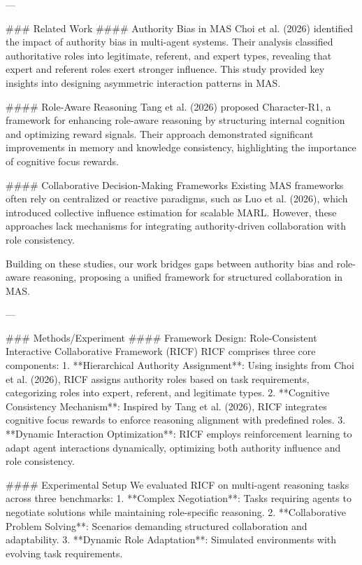 ---

### Related Work
#### Authority Bias in MAS
Choi et al. (2026) identified the impact of authority bias in multi-agent systems. Their analysis classified authoritative roles into legitimate, referent, and expert types, revealing that expert and referent roles exert stronger influence. This study provided key insights into designing asymmetric interaction patterns in MAS.

#### Role-Aware Reasoning
Tang et al. (2026) proposed Character-R1, a framework for enhancing role-aware reasoning by structuring internal cognition and optimizing reward signals. Their approach demonstrated significant improvements in memory and knowledge consistency, highlighting the importance of cognitive focus rewards.

#### Collaborative Decision-Making Frameworks
Existing MAS frameworks often rely on centralized or reactive paradigms, such as Luo et al. (2026), which introduced collective influence estimation for scalable MARL. However, these approaches lack mechanisms for integrating authority-driven collaboration with role consistency.

Building on these studies, our work bridges gaps between authority bias and role-aware reasoning, proposing a unified framework for structured collaboration in MAS.

---

### Methods/Experiment
#### Framework Design: Role-Consistent Interactive Collaborative Framework (RICF)
RICF comprises three core components:
1. **Hierarchical Authority Assignment**: Using insights from Choi et al. (2026), RICF assigns authority roles based on task requirements, categorizing roles into expert, referent, and legitimate types.
2. **Cognitive Consistency Mechanism**: Inspired by Tang et al. (2026), RICF integrates cognitive focus rewards to enforce reasoning alignment with predefined roles.
3. **Dynamic Interaction Optimization**: RICF employs reinforcement learning to adapt agent interactions dynamically, optimizing both authority influence and role consistency.

#### Experimental Setup
We evaluated RICF on multi-agent reasoning tasks across three benchmarks:
1. **Complex Negotiation**: Tasks requiring agents to negotiate solutions while maintaining role-specific reasoning.
2. **Collaborative Problem Solving**: Scenarios demanding structured collaboration and adaptability.
3. **Dynamic Role Adaptation**: Simulated environments with evolving task requirements.

